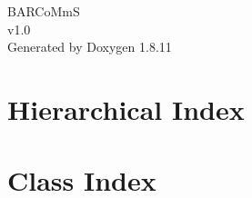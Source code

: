 \documentclass[twoside]{book}
\newcommand{\+}{\discretionary{\mbox{\scriptsize$\hookleftarrow$}}{}{}}
\newcommand{\clearemptydoublepage}{%
  \newpage{\pagestyle{empty}\cleardoublepage}%
}
\begin{document}
\hypersetup{pageanchor=false,
             bookmarksnumbered=true,
             pdfencoding=unicode
            }
\begin{titlepage}
\vspace*{7cm}
\begin{center}%
{\Large B\+A\+R\+Co\+MmS \\[1ex]\large v1.\+0 }\\
\vspace*{1cm}
{\large Generated by Doxygen 1.8.11}\\
\end{center}
\end{titlepage}
\clearemptydoublepage
\tableofcontents
\clearemptydoublepage
{}
\hypersetup{pageanchor=true}

\chapter{Hierarchical Index}

\chapter{Class Index}

\end{document}

